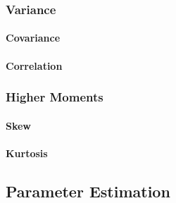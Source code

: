 
\subsubsection{Variance}


\paragraph{Covariance}

\paragraph{Correlation}


\subsubsection{Higher Moments}

\paragraph{Skew}

\paragraph{Kurtosis}







\subsection{Parameter Estimation}





